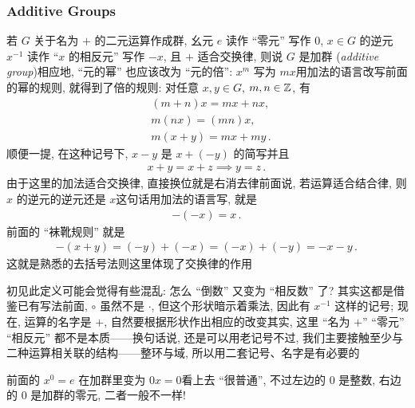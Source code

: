 \subsubsection*{Additive Groups}

\begin{definition}
    若 $G$ 关于名为 $+$ 的二元运算作成群, 幺元 $e$ 读作 ``零元'' 写作 $0$, $x \in G$ 的逆元 $x^{-1}$ 读作 ``$x$ 的相反元'' 写作 $-x$, 且 $+$ 适合交换律, 则说 $G$ 是加群 (\textit{additive group})\period 相应地, ``元的幂'' 也应该改为 ``元的倍'': $x^m$ 写为 $mx$\period 用加法的语言改写前面的幂的规则, 就得到了倍的规则: 对任意 $x,y \in G$, $m,n \in \mathbb{Z}$, 有
    \begin{align*}
         & (m+n)x = mx + nx,       \\
         & m(nx) = (mn)x,          \\
         & m(x+y) = mx + my\period
    \end{align*}
    顺便一提, 在这种记号下, $x-y$ 是 $x+(-y)$ 的简写\period 并且
    \begin{align*}
        x + y = x + z \implies y = z\period
    \end{align*}
    由于这里的加法适合交换律, 直接换位就是右消去律\period 前面说, 若运算适合结合律, 则 $x$ 的逆元的逆元还是 $x$\period 这句话用加法的语言写, 就是
    \begin{align*}
        -(-x) = x\period
    \end{align*}
    前面的 ``袜靴规则'' 就是
    \begin{align*}
        -(x+y) = (-y) + (-x) = (-x) + (-y) = -x-y\period
    \end{align*}
    这就是熟悉的去括号法则\period 这里体现了交换律的作用\period
\end{definition}

\begin{remark}
    初见此定义可能会觉得有些混乱: 怎么 ``倒数'' 又变为 ``相反数'' 了? 其实这都是借鉴已有写法\period 前面, $\circ$ 虽然不是 $\cdot$, 但这个形状暗示着乘法, 因此有 $x^{-1}$ 这样的记号; 现在, 运算的名字是 $+$, 自然要根据形状作出相应的改变\period 其实, 这里 ``名为 $+$'' ``零元'' ``相反元'' 都不是本质——换句话说, 还是可以用老记号\period 不过, 我们主要接触至少与二种运算相关联的结构——整环与域, 所以用二套记号、名字是有必要的\period
\end{remark}

\begin{remark}
    前面的 $x^0 = e$ 在加群里变为 $0x = 0$\period 看上去 ``很普通'', 不过左边的 $0$ 是整数, 右边的 $0$ 是加群的零元, 二者一般不一样!
\end{remark}

